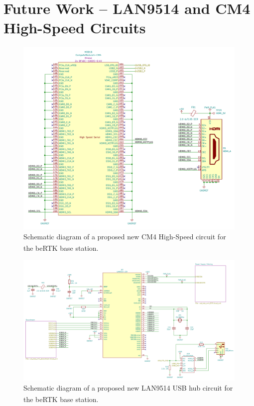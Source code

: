 

\chapter{Future Work -- LAN9514 and CM4 High-Speed Circuits}\label{ann:NEW_LAN9514}

\begin{figure}[h]
	\centering
	\includegraphics[width=1.0\textwidth]{Chapters/Figures/chapter5/prototype/new_CM4_HighSpeed.pdf}
	\caption{Schematic diagram of a proposed new CM4 High-Speed circuit for the beRTK\textsuperscript{\textregistered} base station.}
	\label{fig:new_CM4_HighSpeed}
\end{figure}%

\begin{figure}[h]
	\centering
	\includegraphics[width=1.0\textwidth]{Chapters/Figures/chapter5/prototype/NEW_USB_Hub_1.pdf}
	\caption{Schematic diagram of a proposed new LAN9514 USB hub circuit for the beRTK\textsuperscript{\textregistered} base station.}
	\label{fig:NEW_USB_Hub_1}
\end{figure}%
